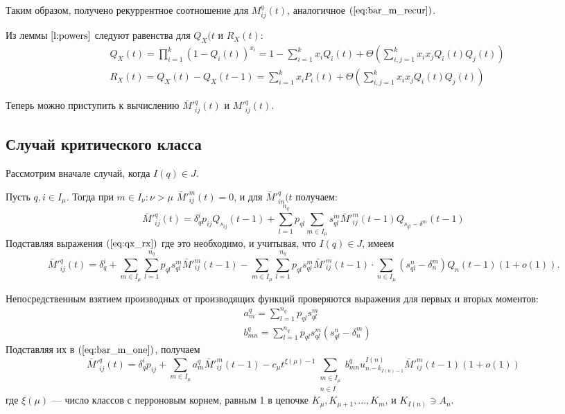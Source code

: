 \documentclass[11pt]{article}
\begin{document}
Таким образом, получено рекуррентное соотношение для $M^q_{ij}(t)$, аналогичное $(\ref{eq:bar_m_recur})$.

Из леммы $\ref{l:powers}$ следуют равенства для $Q_X(t$ и $R_X(t)$:
\begin{equation}
\label{eq:qx_rx}
    \begin{split}
        &Q_X(t) = \prod_{i = 1}^k (1 - Q_i(t))^{x_i} = 1 - \sum_{i = 1}^k x_i Q_i(t) + \Theta\left( \sum_{i,j = 1}^k x_i x_j Q_i(t) Q_j(t) \right) \\
        &R_X(t) = Q_X(t) - Q_X(t-1) = \sum_{i = 1}^k x_i P_i(t) + \Theta\left( \sum_{i,j = 1}^k x_i x_j Q_i(t) Q_j(t) \right)
    \end{split}
\end{equation}

Теперь можно приступить к вычислению $\bar{M}'^q_{ij}(t)$ и $M'^q_{ij}(t)$.

\subsection{Случай критического класса}

Рассмотрим вначале случай, когда $I(q) \in J$.

Пусть $q,i \in I_\mu$. Тогда при $m \in I_\nu : \nu > \mu$ $\bar{M}'^m_{ij}(t) = 0$, и для $\bar{M}'^q_{in}(t$ получаем:
\begin{equation}
    \bar{M}'^q_{ij}(t) = \delta^i_q p_{ij} Q_{s_{ij}}(t-1) + \sum_{l = 1}^{n_q} p_{ql} \sum_{m \in I_\mu} s_{ql}^m \bar{M}'^m_{ij}(t-1) Q_{s_{ql} - \delta^m}(t-1)
\end{equation}
Подставляя выражения $(\ref{eq:qx_rx})$ где это необходимо, и учитывая, что $I(q) \in J$, имеем
\begin{equation}
\label{eq:bar_m_one}
    \bar{M}'^q_{ij}(t) = \delta^i_q + \sum_{m \in I_\mu} \sum_{l = 1}^{n_q} p_{ql} s_{ql}^m \bar{M}'^m_{ij}(t-1) - \sum_{m \in I_\mu} \sum_{l = 1}^{n_q} p_{ql} s_{ql}^m \bar{M}'^m_{ij}(t-1) \cdot \sum_{n \in I_\mu} (s_{ql}^n - \delta^m_n) Q_n(t-1) (1 + o(1)).
\end{equation}

Непосредственным взятием производных от производящих функций проверяются выражения для первых и вторых моментов:
\begin{equation}
\label{eq:moments}
    \begin{split}
        &a^q_m = \sum_{l = 1}^{n_q} p_{ql} s_{ql}^m \\
        &b^q_{mn} = \sum_{l = 1}^{n_q} p_{ql} s_{ql}^m (s_{ql}^n - \delta^m_n)
    \end{split}
\end{equation}
Подставляя их в $(\ref{eq:bar_m_one})$, получаем
\begin{equation}
\label{eq:bar_m_ksi}
    \bar{M}'^q_{ij}(t) = \delta^i_q p_{ij} + \sum_{m \in I_\mu} a^q_m \bar{M}'^m_{ij}(t-1) - c_\mu t^{\xi(\mu) - 1} \sum_{\substack{m \in I_\mu \\ n \in I}} b^q_{mn} u^{I(n)}_{n - k_{I(n)-1}} \bar{M}'^m_{ij}(t-1) (1 + o(1))
\end{equation}
где $\xi(\mu)$ --- число классов с перроновым корнем, равным 1 в цепочке $K_\mu, K_{\mu+1}, \ldots, K_m$, и $K_{I(n)} \ni A_n$.
\end{document}
